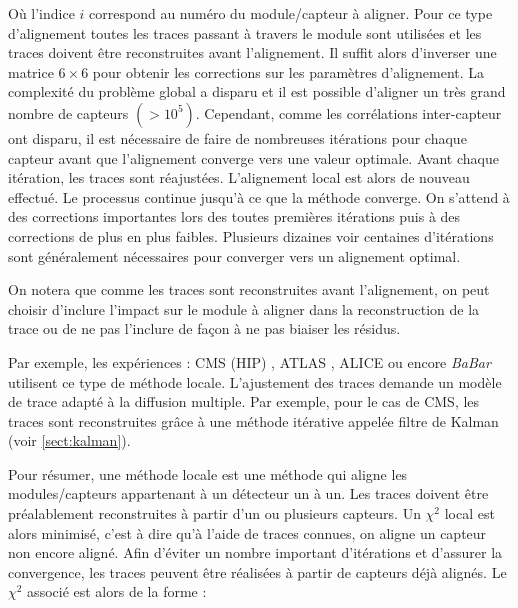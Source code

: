    Où l'indice $i$ correspond au num\'ero du module/capteur \`a aligner. Pour ce type d'alignement toutes les traces passant \`a travers le module sont utilis\'ees et les traces doivent \^etre reconstruites avant l'alignement. Il suffit alors d'inverser une matrice $6 \times 6$ pour obtenir les corrections sur les param\`etres d'alignement. La complexit\'e du probl\`eme global a disparu et il est possible d'aligner un tr\`es grand nombre de capteurs $(> 10^5)$. Cependant, comme les corrélations inter-capteur ont disparu, il est n\'ecessaire de faire de nombreuses it\'erations pour chaque capteur avant  que l'alignement converge vers une valeur optimale. Avant chaque it\'eration, les traces sont r\'eajust\'ees. L'alignement local est alors de nouveau effectu\'e. Le processus continue jusqu'\`a ce que la m\'ethode converge. On s'attend \`a des corrections importantes lors des toutes premi\`eres it\'erations puis \`a des corrections de plus en plus faibles. Plusieurs dizaines voir centaines d'it\'erations sont g\'en\'eralement n\'ecessaires pour converger vers un alignement optimal. 
   
   \medskip
   
   On notera que comme les traces sont reconstruites avant l'alignement, on peut choisir d'inclure l'impact sur le module \`a aligner dans la reconstruction de la trace ou de ne pas l'inclure de façon \`a ne pas biaiser les r\'esidus.
   
   \medskip
   
   Par exemple, les exp\'eriences : CMS (HIP) \cite{Karimaki:2006az}, ATLAS \cite{de2012alignment} \cite{Schilling:2006zz}, ALICE \cite{Aamodt:2010aa} ou encore \textit{BaBar} \cite{Brown:2008ccb} utilisent ce type de m\'ethode locale. L'ajustement des traces demande un mod\`ele de trace adapt\'e \`a la diffusion multiple. Par exemple, pour le cas de CMS, les traces sont reconstruites gr\^ace \`a une m\'ethode it\'erative appel\'ee filtre de Kalman (voir \ref{sect:kalman}).
   
   \medskip
   
   Pour r\'esumer, une m\'ethode locale est une m\'ethode qui aligne les modules/capteurs appartenant \`a un d\'etecteur un \`a un. Les traces doivent \^etre pr\'ealablement reconstruites \`a partir d'un ou plusieurs capteurs. Un $\chi^2$ local est alors minimis\'e, c'est \`a dire qu'\`a l'aide de traces connues, on aligne un capteur non encore align\'e. Afin d'\'eviter un nombre important d'it\'erations et d'assurer la convergence, les traces peuvent \^etre r\'ealis\'ees \`a partir de capteurs d\'ej\`a align\'es. Le $\chi^2$ associ\'e est alors de la forme :
   
